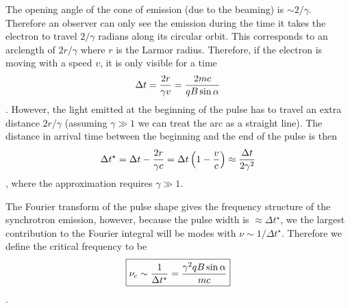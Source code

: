 \begin{enumerate}
      The opening angle of the cone of emission (due to the beaming) is $\sim2/\gamma$.
      Therefore an observer can only see the emission during the time it takes the electron
      to travel $2/\gamma$ radians along its circular orbit.  This corresponds to an arclength
      of $2r/\gamma$ where $r$ is the Larmor radius.
      Therefore, if the electron is moving with a speed $v$, it is only visible for a time
      \begin{dmath}
        \Delta t = \frac{2r}{\gamma v}\nolinebreak=\nolinebreak \frac{2mc}{qB\sin\alpha}
      \end{dmath}.
      However, the light emitted at the beginning of the pulse has to travel an extra
      distance $2r/\gamma$ (assuming $\gamma \gg 1$ we can treat the arc as a straight line).
      The distance in arrival time between the beginning and the end of the pulse is then
      \begin{dmath}
        \Delta t^\star = \Delta t - \frac{2r}{\gamma c}
            \nolinebreak=\nolinebreak \Delta t\left(1-\frac{v}{c}\right)
            \nolinebreak\approx\nolinebreak \frac{\Delta t}{2\gamma^2}
      \end{dmath},
      where the approximation requires $\gamma \gg 1$.

      The Fourier transform of the pulse shape gives the frequency structure of the synchrotron
      emission, however, because the pulse width is $\approx\Delta t^\star$, we the largest
      contribution to the Fourier integral will be modes with $\nu\sim1/\Delta t^\star$.
      Therefore we define the critical frequency to be
      \begin{dmath}\boxed{
        \nu_c \sim \frac{1}{\Delta t^\star} \nolinebreak=\nolinebreak \frac{\gamma^2 qB\sin\alpha}{mc}
      }\end{dmath}.


\end{enumerate}
